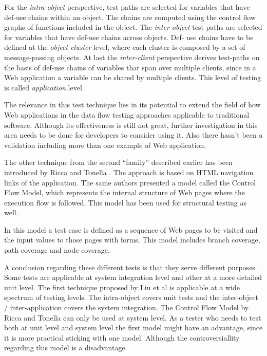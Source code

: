 \documentclass[a4paper]{article}
\begin{document}
For the \emph{intra-object} perspective, test paths are selected for variables that have def-use chains within
an object. The chains are computed using the control flow graphs of functions included in the object.
The \emph{inter-object} test paths are selected for variables that have def-use chains across objects. Def-
use chains have to be defined at the \emph{object cluster} level, where each cluster is composed by a set of
message-passing objects. At last the \emph{inter-client} perspective derives test-paths on the basis of def-use
chains of variables that span over multiple clients, since in a Web application a variable can be shared
by multiple clients. This level of testing is called \emph{application} level.

The relevance in this test technique lies in its potential to extend the field of how Web applications in
the data flow testing approaches applicable to traditional software. Although its effectiveness is still
not great, further investigation in this area needs to be done for developers to consider using it. Also
there hasn’t been a validation including more than one example of Web application.

The other technique from the second “family” described earlier has been introduced by Ricca and
Tonella \cite{rt01}. The approach is based on HTML navigation links of the application. The same authors
presented a model called the Control Flow Model, which represents the internal structure of Web
pages where the execution flow is followed. This model has been used for structural testing as well.

In this model a test case is defined as a sequence of Web pages to be visited and the input values to
those pages with forms. This model includes branch coverage, path coverage and node coverage.

A conclusion regarding these different tests is that they serve different purposes. Some tests are
applicable at system integration level and other at a more detailed unit level. The first technique
proposed by Liu et al is applicable at a wide spectrum of testing levels. The intra-object covers unit
tests and the inter-object / inter-application covers the system integration. The Control Flow Model
by Ricca and Tonella can only be used at system level. As a tester who needs to test both at unit level
and system level the first model might have an advantage, since it is more practical sticking with one
model. Although the controversiallity regarding this model is a disadvantage.
\end{document}
